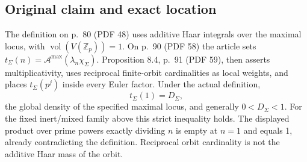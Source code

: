 \documentclass[10pt]{article}
\begin{document}
\subsection*{Original claim and exact location}
The definition on p. 80 (PDF 48) uses additive Haar integrals over the maximal locus, with \(\operatorname{vol}(V(\mathbb Z_p))=1\). On p. 90 (PDF 58) the article sets \(t_\Sigma(n)=\mathcal A^{\max}(\lambda_n\chi_\Sigma)\). Proposition 8.4, p. 91 (PDF 59), then asserts multiplicativity, uses reciprocal finite-orbit cardinalities as local weights, and places \(t_\Sigma(p^j)\) inside every Euler factor. Under the actual definition, \[t_\Sigma(1)=D_\Sigma,\] the global density of the specified maximal locus, and generally \(0<D_\Sigma<1\). For the fixed inert/mixed family above this strict inequality holds. The displayed product over prime powers exactly dividing \(n\) is empty at \(n=1\) and equals 1, already contradicting the definition. Reciprocal orbit cardinality is not the additive Haar mass of the orbit.\par
\end{document}

